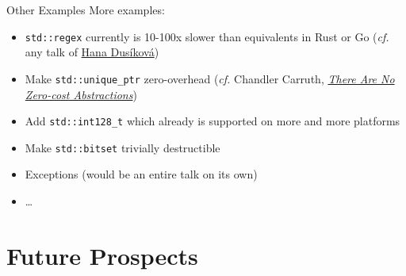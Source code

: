 \begin{frame}{Other Examples}
    More examples:
    \begin{itemize}
        \item \texttt{std::regex} currently is 10-100x slower than equivalents in Rust or Go (\textit{cf.} any talk of \href{https://youtu.be/8dKWdJzPwHw}{Hana Dusíková})
        \item Make \texttt{std::unique\_ptr} zero-overhead (\textit{cf.} Chandler Carruth, \href{https://youtu.be/rHIkrotSwcc}{\textit{There Are No Zero-cost Abstractions}})
        \item Add \texttt{std::int128\_t} which already is supported on more and more platforms
        \item Make \texttt{std::bitset} trivially destructible
        \item Exceptions (would be an entire talk on its own)
        \item \ldots 
    \end{itemize}

    \centering
\end{frame}

\section{Future Prospects}

\begin{frame}
    \centering
    \scalebox{3}{Future Prospects}
\end{frame}

